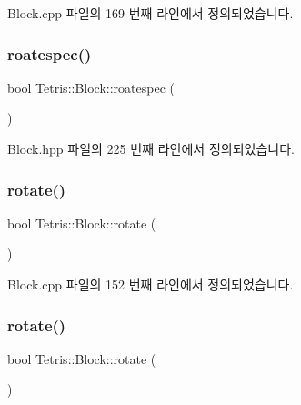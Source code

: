 Block.\+cpp 파일의 169 번째 라인에서 정의되었습니다.

\mbox{\label{class_tetris_1_1_block_a787424e5e9ec2807989121e8dcee1a7a}} 
\subsubsection{\texorpdfstring{roatespec()}{roatespec()}\hspace{0.1cm}{\footnotesize\ttfamily [2/2]}}
{\footnotesize\ttfamily bool Tetris\+::\+Block\+::roatespec (\begin{DoxyParamCaption}{ }\end{DoxyParamCaption})\hspace{0.3cm}{\ttfamily [inline]}}



Block.\+hpp 파일의 225 번째 라인에서 정의되었습니다.

\mbox{\label{class_tetris_1_1_block_a0d1eb57e6da91832ad983f7a4fa9ca04}} 
\subsubsection{\texorpdfstring{rotate()}{rotate()}\hspace{0.1cm}{\footnotesize\ttfamily [1/2]}}
{\footnotesize\ttfamily bool Tetris\+::\+Block\+::rotate (\begin{DoxyParamCaption}{ }\end{DoxyParamCaption})}



Block.\+cpp 파일의 152 번째 라인에서 정의되었습니다.

\mbox{\label{class_tetris_1_1_block_a0d1eb57e6da91832ad983f7a4fa9ca04}} 
\subsubsection{\texorpdfstring{rotate()}{rotate()}\hspace{0.1cm}{\footnotesize\ttfamily [2/2]}}
{\footnotesize\ttfamily bool Tetris\+::\+Block\+::rotate (\begin{DoxyParamCaption}{ }\end{DoxyParamCaption})\hspace{0.3cm}{\ttfamily [inline]}}

